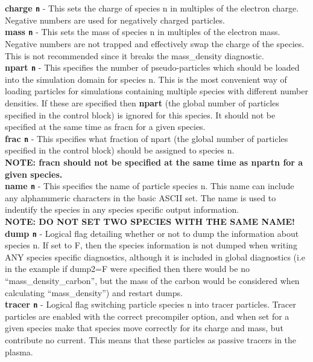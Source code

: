 \documentclass[12pt,a4paper]{article}
\newcommand{\emphtext}{\color{warwickdark} \fontfamily{phv}\selectfont\Large\bf}
\newcommand{\inlinecode}[1]{{\color{warwickred} \bf\texttt{#1}}}
\newcommand{\inlineemph}[1]{{\color{warwicklight} \bf{#1}}}
\begin{document}
{\emphtext charge\inlinecode{n}} - This sets the charge of species n in
multiples of the electron charge. Negative numbers are used for negatively
charged particles.\\

{\emphtext mass\inlinecode{n}} - This sets the mass of species n in multiples
of the electron mass. Negative numbers are not trapped and effectively swap the
charge of the species. This is not recommended since it breaks the
mass\_density diagnostic.\\

{\emphtext npart\inlinecode{n}} - This specifies the number of pseudo-particles
which should be loaded into the simulation domain for species n. This is the
most convenient way of loading particles for simulations containing multiple
species with different number densities. If these are specified then
\inlineemph{npart} (the global number of particles specified in the control
block) is ignored for this species. It should not be specified at the same time
as fracn for a given species.\\

{\emphtext frac\inlinecode{n}} - This specifies what fraction of npart (the
global number of particles specified in the control block) should be assigned
to species n. \\

{\emphtext NOTE: fracn should not be specified at the same time as npartn for a
given species.}\\

{\emphtext name\inlinecode{n}} - This specifies the name of particle species
n. This name can include any alphanumeric characters in the basic ASCII
set. The name is used to indentify the species in any species specific output
information. \\

{\emphtext NOTE: DO NOT SET TWO SPECIES WITH THE SAME NAME!}\\

{\emphtext dump\inlinecode{n}} - Logical flag detailing whether or not to dump
the information about species n. If set to F, then the species information is
not dumped when writing ANY species specific diagnostics, although it is
included in global diagnostics (i.e in the example if dump2=F were specified
then there would be no ``mass\_density\_carbon'', but the mass of the carbon
would be considered when calculating ``mass\_density'') and restart dumps.\\

{\emphtext tracer\inlinecode{n}} - Logical flag switching particle species n
into tracer particles. Tracer particles are enabled with the correct
precompiler option, and when set for a given species make that species move
correctly for its charge and mass, but contribute no current. This means that
these particles as passive tracers in the plasma.\\
\end{document}
